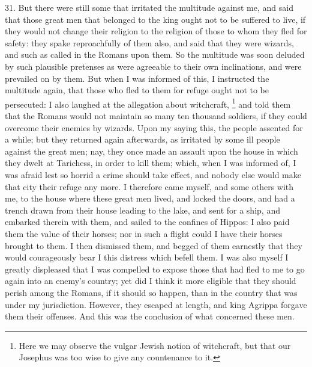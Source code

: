 31. But there were still some that irritated the multitude against me, and
said that those great men that belonged to the king ought not to be
suffered to live, if they would not change their religion to the religion
of those to whom they fled for safety: they spake reproachfully of them
also, and said that they were wizards, and such as called in the Romans
upon them. So the multitude was soon deluded by such plausible pretenses
as were agreeable to their own inclinations, and were prevailed on by
them. But when I was informed of this, I instructed the multitude again,
that those who fled to them for refuge ought not to be persecuted: I also
laughed at the allegation about witchcraft, \footnote{Here we may observe the
vulgar Jewish notion of witchcraft, but that our Josephus was too wise to
give any countenance to it.} and told
them that the Romans would not maintain so many ten thousand soldiers, if
they could overcome their enemies by wizards. Upon my saying this, the
people assented for a while; but they returned again afterwards, as
irritated by some ill people against the great men; nay, they once made an
assault upon the house in which they dwelt at Tarichess, in order to kill
them; which, when I was informed of, I was afraid lest so horrid a crime
should take effect, and nobody else would make that city their refuge any
more. I therefore came myself, and some others with me, to the house where
these great men lived, and locked the doors, and had a trench drawn from
their house leading to the lake, and sent for a ship, and embarked therein
with them, and sailed to the confines of Hippos: I also paid them the
value of their horses; nor in such a flight could I have their horses
brought to them. I then dismissed them, and begged of them earnestly that
they would courageously bear I this distress which befell them. I was also
myself I greatly displeased that I was compelled to expose those that had
fled to me to go again into an enemy's country; yet did I think it more
eligible that they should perish among the Romans, if it should so happen,
than in the country that was under my jurisdiction. However, they escaped
at length, and king Agrippa forgave them their offenses. And this was the
conclusion of what concerned these men.

